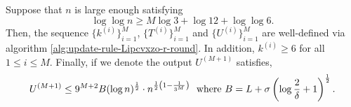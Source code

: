 \begin{lemma}
\label{lemma:ef-zeroth-order-nonsmooth-r-round-one-dim}
Suppose that $n$ is large enough satisfying
\begin{equation}
\label{eqn:condition-n-zeroth-order-ns-r-round-1dim}
\log \log n \geq M\log 3 + \log 12 +\log \log 6. 
\end{equation}
Then, the sequence $\{k^{(i)}\}_{i=1}^M$, $\{T^{(i)}\}_{i=1}^M$ and 
$\{U^{(i)}\}_{i=1}^M$ are well-defined via algorithm 
\ref{alg:update-rule-Lipcvxzo-r-round}. In addition, $k^{(i)} \geq 6$
for all $1\leq i\leq M$. Finally, if we denote the output $U^{(M+1)}$
satisfies, 
\begin{equation}
\label{eqn:zo-ns-r-second-part}
U^{(M+1)} %
 \leq 9^{M+2}B (\log n)^\half \cdot  n^{\frac{1}{2}\left(1-\frac{1}{3^M}\right)}~~\text{where}~B = 
 	L  + \sigma \left(\log \frac{2}{\delta}+1\right)^\half. 
\end{equation}
\end{lemma}
